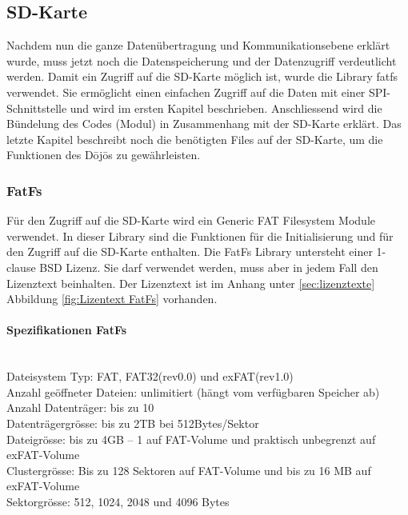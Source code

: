 \subsection{SD-Karte}\label{sec:sdKarte}

Nachdem nun die ganze Datenübertragung und Kommunikationsebene erklärt wurde, muss jetzt noch die Datenspeicherung und der Datenzugriff verdeutlicht werden. Damit ein Zugriff auf die SD-Karte möglich ist, wurde die Library fatfs verwendet. Sie ermöglicht einen einfachen Zugriff auf die Daten mit einer SPI-Schnittstelle und wird im ersten Kapitel beschrieben. Anschliessend wird die Bündelung des Codes (Modul) in Zusammenhang mit der SD-Karte erklärt. Das letzte Kapitel beschreibt noch die benötigten Files auf der SD-Karte, um die Funktionen des Dōjōs zu gewährleisten.

\subsubsection{FatFs}

Für den Zugriff auf die SD-Karte wird ein Generic FAT Filesystem Module verwendet. In dieser Library sind die Funktionen für die Initialisierung und für den Zugriff auf die SD-Karte enthalten. Die FatFs Library untersteht einer 1-clause BSD Lizenz. Sie darf verwendet werden, muss aber in jedem Fall den Lizenztext beinhalten. Der Lizenztext ist im Anhang unter \ref{sec:lizenztexte} Abbildung \ref{fig:Lizentext FatFs} vorhanden.

\paragraph{Spezifikationen FatFs}$~~$\\
Dateisystem Typ: FAT, FAT32(rev0.0) und exFAT(rev1.0)\\
Anzahl geöffneter Dateien: unlimitiert (hängt vom verfügbaren Speicher ab)\\
Anzahl Datenträger: bis zu 10\\
Datenträgergrösse: bis zu 2TB bei 512Bytes/Sektor\\
Dateigrösse: bis zu 4GB – 1 auf FAT-Volume und praktisch unbegrenzt auf exFAT-Volume\\
Clustergrösse: Bis zu 128 Sektoren auf FAT-Volume und bis zu 16 MB auf exFAT-Volume	\\
Sektorgrösse:  512, 1024, 2048 und 4096 Bytes \cite{FatFs}\\ 

